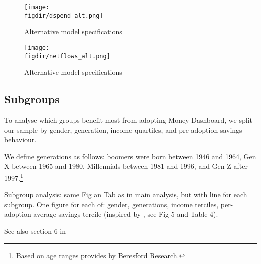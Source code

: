 \begin{figure}[H]
    \centering
    \caption{Alternative model specifications}%
    \texttt{[image: \\figdir/dspend\_alt.png]}
\end{figure}




\begin{figure}[H]
    \centering
    \caption{Alternative model specifications}%
    \texttt{[image: \\figdir/netflows\_alt.png]}
\end{figure}





\subsection{Subgroups}%
\label{sub:subgroups}

To analyse which groups benefit most from adopting Money Dashboard, we split
our sample by gender, generation, income quartiles, and pre-adoption savings
behaviour.

We define generations as follows: boomers were born between 1946 and 1964, Gen
X between 1965 and 1980, Millennials between 1981 and 1996, and Gen Z after
1997.\footnote{Based on age ranges provides by
    \href{https://www.beresfordresearch.com/age-range-by-generation/}{Beresford
Research}.}

Subgroup analysis: same Fig an Tab as in main analysis, but with line for each
subgroup. One figure for each of: gender, generations, income terciles,
per-adoption average savings tercile (inspired by \citet{carlin2017fintech},
see Fig 5 and Table 4).

See also section 6 in \citet{gargano2021goal}


